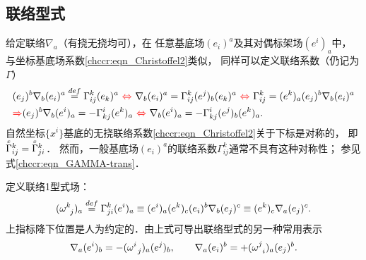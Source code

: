 \subsection{联络型式}\label{chccr:sec_connectionForm}
给定联络$\nabla _a$（有挠无挠均可），在
任意基底场$(e_i)^a$及其对偶标架场$(e^i)_a$中，
与坐标基底场系数\eqref{chccr:eqn_Christoffel2}类似，
同样可以定义联络系数（仍记为$\Gamma$）
    \begin{align}
        &(e_j)^b \nabla _b (e_i)^a  \overset{def}{=} \Gamma^{k}_{ij} (e_k)^a
        {\ \color{red} \Leftrightarrow \ }
        \nabla _b (e_i)^a = \Gamma^{k}_{ij} (e^j)_b (e_k)^a
        {\ \color{red} \Leftrightarrow \ }
        \Gamma^{k}_{ij}  =  (e^k)_a (e_j)^b \nabla _b (e_i)^a \notag \\
        &{\color{red} \Rightarrow }
        (e_j)^b \nabla _b (e^i)_a  = -\Gamma^{i}_{kj} (e^k)_a
        {\ \color{red} \Leftrightarrow \ }
        \nabla _b (e^i)_a = -\Gamma^{i}_{kj}(e^j)_b  (e^k)_a  . \label{chccr:eqn_concoef}
    \end{align}
自然坐标$\{x^i\}$基底的无挠联络系数\eqref{chccr:eqn_Christoffel2}关于下标是对称的，
即$\oversetmy{x}{\Gamma}^{k}_{ij}=\oversetmy{x}{\Gamma}^{k}_{ji}$．
然而，一般基底场$(e_i)^a$的联络系数$\Gamma^{k}_{ij}$通常不具有这种对称性；
参见式\eqref{chccr:eqn_GAMMA-trans}．



定义{\heiti 联络1型式场}：
\begin{equation}\label{chccr:def_1form}
    (\omega_{\hphantom{a} j}^{k})_a \overset{def}{=} \Gamma_{ji}^k (e^i)_a
    \equiv (e^i)_a (e^k)_c (e_i)^b \nabla _b (e_j)^c
    \equiv (e^k)_c \nabla _a (e_j)^c .
\end{equation}
上指标降下位置是人为约定的．由上式可导出联络型式的另一种常用表示
\begin{equation}\label{chccr:eqn_D-omega-form}
    \nabla _a (e^i)_b= - (\omega_{\hphantom{a} j}^{i})_a (e^j)_b ,\qquad
    \nabla _a (e_i)^b= + (\omega_{\hphantom{a} i}^{j})_a (e_j)^b .
\end{equation}


